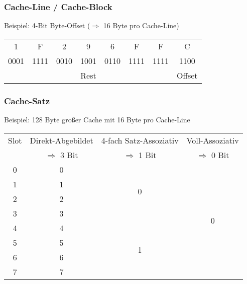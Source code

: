 \documentclass[xcolor=pdftex,dvipsnames,table]{beamer}
\begin{document}
\begin{frame}
	\frametitle{Cache-Line / Cache-Block}
	Beispiel: 4-Bit Byte-Offset ($\Rightarrow$ 16 Byte pro Cache-Line)
	\begin{tabular}{|c|c|c|c|c|c|c|c|}
		\hline
		1 & F & 2 & 9 & 6 & F & F & C \\
		0001 & 1111 & 0010 & 1001 & 0110 & 1111 & 1111 & 1100\\
		\hline
		\multicolumn{7}{|c|}{Rest} &
		Offset \\
		\hline
	\end{tabular}
\end{frame}

\begin{frame}
	\frametitle{Cache-Satz}
		
	Beispiel: 128 Byte großer Cache mit 16 Byte pro Cache-Line
	\begin{tabular}{|c|c|c|c|}
		\hline
		Slot & Direkt-Abgebildet & 4-fach Satz-Assoziativ & Voll-Assoziativ \\
		 & $\Rightarrow$ 3 Bit & $\Rightarrow$ 1 Bit & $\Rightarrow$ 0 Bit \\
		\hline
		\hline
		0 & 0 & \multirow{4}{*}{0} & \multirow{8}{*}{0} \\
		\cline{2-2}
		1 & 1 &  &  \\
		\cline{2-2}
		2 & 2 &  &  \\
		\cline{2-2}
		3 & 3 &  &  \\
		\cline{2-2}
		\cline{3-3}
		4 & 4 & \multirow{4}{*}{1} &  \\
		\cline{2-2}
		5 & 5 &  &  \\
		\cline{2-2}
		6 & 6 &  &  \\
		\cline{2-2}
		7 & 7 &  &  \\

		\hline
	\end{tabular}
\end{frame}
\end{document}
